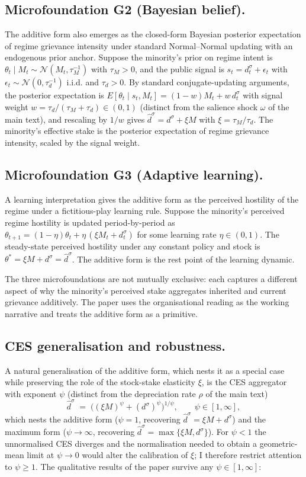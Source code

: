 \documentclass[11pt,twoside]{extarticle}
\begin{document}
\subsection*{Microfoundation G2 (Bayesian belief).} The additive form also emerges as the closed-form Bayesian posterior expectation of regime grievance intensity under standard Normal--Normal updating with an endogenous prior anchor. Suppose the minority's prior on regime intent is $\theta_t\mid M_t\sim\mathcal N(M_t,\tau_M^{-1})$ with $\tau_M>0$, and the public signal is $s_t=d_t^\sigma+\epsilon_t$ with $\epsilon_t\sim\mathcal N(0,\tau_d^{-1})$ i.i.d. and $\tau_d>0$. By standard conjugate-updating arguments, the posterior expectation is $E[\theta_t\mid s_t,M_t]=(1-w)M_t+w\,d_t^\sigma$ with signal weight $w=\tau_d/(\tau_M+\tau_d)\in(0,1)$ (distinct from the salience shock $\omega$ of the main text), and rescaling by $1/w$ gives $\hat d^\sigma=d^\sigma+\xi M$ with $\xi=\tau_M/\tau_d$. The minority's effective stake is the posterior expectation of regime grievance intensity, scaled by the signal weight.

\subsection*{Microfoundation G3 (Adaptive learning).} A learning interpretation gives the additive form as the perceived hostility of the regime under a fictitious-play learning rule. Suppose the minority's perceived regime hostility is updated period-by-period as $\theta_{t+1}=(1-\eta)\theta_t+\eta\,(\xi M_t+d_t^\sigma)$ for some learning rate $\eta\in(0,1)$. The steady-state perceived hostility under any constant policy and stock is $\theta^*=\xi M+d^\sigma=\hat d^\sigma$. The additive form is the rest point of the learning dynamic.

The three microfoundations are not mutually exclusive: each captures a different aspect of why the minority's perceived stake aggregates inherited and current grievance additively. The paper uses the organisational reading as the working narrative and treats the additive form as a primitive.

\subsection*{CES generalisation and robustness.} A natural generalisation of the additive form, which nests it as a special case while preserving the role of the stock-stake elasticity $\xi$, is the CES aggregator with exponent $\psi$ (distinct from the depreciation rate $\rho$ of the main text)
\begin{equation}\label{eq:CES_oa}
    \hat d^\sigma\;=\;\big((\xi M)^\psi+(d^\sigma)^\psi\big)^{1/\psi},\qquad \psi\in[1,\infty],
\end{equation}
which nests the additive form ($\psi=1$, recovering $\hat d^\sigma=\xi M+d^\sigma$) and the maximum form ($\psi\to\infty$, recovering $\hat d^\sigma=\max\{\xi M,d^\sigma\}$). For $\psi<1$ the unnormalised CES diverges and the normalisation needed to obtain a geometric-mean limit at $\psi\to 0$ would alter the calibration of $\xi$; I therefore restrict attention to $\psi\ge 1$. The qualitative results of the paper survive any $\psi\in[1,\infty]$:
\end{document}
